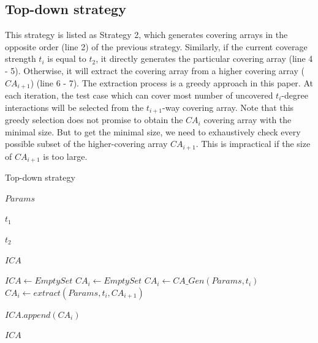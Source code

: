 \documentclass[conference]{IEEEtran}
\theoremstyle{definition}
\begin{document}
\subsection{Top-down strategy}
This strategy is listed as Strategy 2, which generates covering arrays in the opposite order (line 2) of the previous strategy. Similarly, if the current coverage strength $t_{i}$ is equal to $t_{2}$, it directly generates the particular covering array (line 4 - 5). Otherwise, it will extract the covering array from a higher covering array ($CA_{i + 1}$) (line 6 - 7). The extraction process is a greedy approach in this paper. At each iteration, the test case which can cover most number of uncovered $t_{i}$-degree interactions will be selected from the $t_{i+1}$-way covering array.  Note that this greedy selection does not promise to obtain the $CA_{i}$ covering array with the minimal size. But to get the minimal size, we need to exhaustively check every possible subset of the higher-covering array $CA_{i+1}$. This is impractical if the size of $CA_{i + 1}$ is too large.

%
\begin{algorithm}
  \caption{Top-down strategy}
  \begin{algorithmic}[1]
    \Require
     $Params$ 

     $t_{1}$ 

     $t_{2}$ 

     \Ensure  $ICA$ 

      \State $ICA \leftarrow Empty Set$
         \State $CA_{i} \leftarrow  Empty Set $
                \State $CA_{i} \leftarrow CA\_Gen(Params, t_{i})$
         \Else
              \State $CA_{i} \leftarrow  extract(Params, t_{i}, CA_{i + 1})$
        \EndIf

        \State $ICA.append(CA_{i})$
      \EndFor

     \State \Return $ICA$
  \end{algorithmic}
\end{algorithm}
\end{document}
